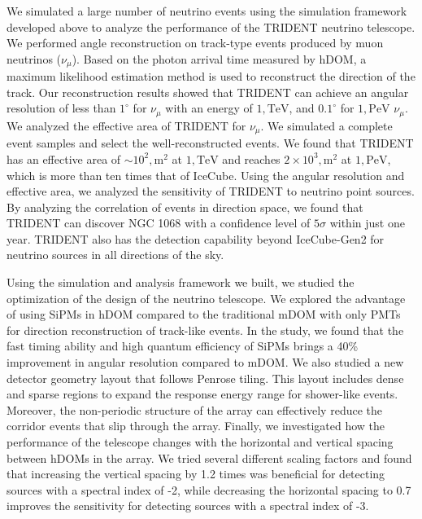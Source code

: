 \begin{eabstract}
We simulated a large number of neutrino events using the simulation framework developed above to analyze the performance of the TRIDENT neutrino telescope. We performed angle reconstruction on track-type events produced by muon neutrinos ($\nu_\mu$). Based on the photon arrival time measured by hDOM, a maximum likelihood estimation method is used to reconstruct the direction of the track. Our reconstruction results showed that TRIDENT can achieve an angular resolution of less than $1^\circ$ for $\nu_\mu$ with an energy of $1,\mathrm{TeV}$, and $0.1^\circ$ for $1,\mathrm{PeV}$ $\nu_\mu$.
We analyzed the effective area of TRIDENT for $\nu_\mu$. We simulated a complete event samples and select the well-reconstructed events. We found that TRIDENT has an effective area of $\sim 10^2,\mathrm{m^2}$ at $1,\mathrm{TeV}$ and reaches $2\times 10^3,\mathrm{m^2}$ at $1,\mathrm{PeV}$, which is more than ten times that of IceCube.
Using the angular resolution and effective area, we analyzed the sensitivity of TRIDENT to neutrino point sources. By analyzing the correlation of events in direction space, we found that TRIDENT can discover NGC 1068 with a confidence level of $5\sigma$ within just one year. TRIDENT also has the detection capability beyond IceCube-Gen2 for neutrino sources in all directions of the sky.


Using the simulation and analysis framework we built, we studied the optimization of the design of the neutrino telescope.
We explored the advantage of using SiPMs in hDOM compared to the traditional mDOM with only PMTs for direction reconstruction of track-like events. In the study, we found that the fast timing ability and high quantum efficiency of SiPMs brings a 40\% improvement in angular resolution compared to mDOM.
We also studied a new detector geometry layout that follows Penrose tiling. This layout includes dense and sparse regions to expand the response energy range for shower-like events. Moreover, the non-periodic structure of the array can effectively reduce the corridor events that slip through the array.
Finally, we investigated how the performance of the telescope changes with the horizontal and vertical spacing between hDOMs in the array. We tried several different scaling factors and found that increasing the vertical spacing by 1.2 times was beneficial for detecting sources with a spectral index of -2, while decreasing the horizontal spacing to 0.7 improves the sensitivity for detecting sources with a spectral index of -3.


\end{eabstract}

